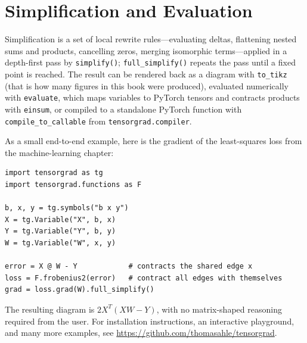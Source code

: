 \section{Simplification and Evaluation}

Simplification is a set of local rewrite rules---evaluating deltas, flattening
nested sums and products, cancelling zeros, merging isomorphic terms---applied
in a depth-first pass by \texttt{simplify()}; \texttt{full\_simplify()} repeats
the pass until a fixed point is reached.
The result can be rendered back as a diagram with \texttt{to\_tikz} (that is how
many figures in this book were produced), evaluated numerically with
\texttt{evaluate}, which maps variables to PyTorch tensors and contracts
products with \texttt{einsum}, or compiled to a standalone PyTorch function
with \texttt{compile\_to\_callable} from \texttt{tensorgrad.compiler}.

As a small end-to-end example, here is the gradient of the least-squares loss
from the machine-learning chapter:

\begin{lstlisting}
import tensorgrad as tg
import tensorgrad.functions as F

b, x, y = tg.symbols("b x y")
X = tg.Variable("X", b, x)
Y = tg.Variable("Y", b, y)
W = tg.Variable("W", x, y)

error = X @ W - Y            # contracts the shared edge x
loss = F.frobenius2(error)   # contract all edges with themselves
grad = loss.grad(W).full_simplify()
\end{lstlisting}

The resulting diagram is $2X^T(XW - Y)$, with no matrix-shaped reasoning
required from the user.
For installation instructions, an interactive playground, and many more
examples, see \url{https://github.com/thomasahle/tensorgrad}.
